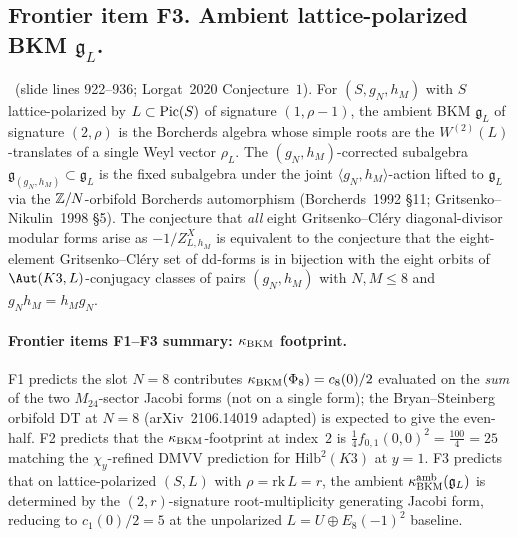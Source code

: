 \subsection*{Frontier item F3. Ambient lattice-polarized BKM $\mathfrak{g}_L$.}
\ClaimStatusConjectured\ (slide lines 922--936; Lorgat~2020
Conjecture~$1$). For $(S, g_N, h_M)$ with $S$ lattice-polarized by
$L\subset\mathrm{Pic}(S)$ of signature $(1,\rho-1)$, the ambient BKM
$\mathfrak{g}_L$ of signature $(2, \rho)$ is the Borcherds algebra
whose simple roots are the $W^{(2)}(L)$-translates of a single Weyl
vector $\rho_L$. The $(g_N, h_M)$-corrected subalgebra
$\mathfrak{g}_{(g_N, h_M)}\subset\mathfrak{g}_L$ is the fixed
subalgebra under the joint $\langle g_N, h_M\rangle$-action lifted to
$\mathfrak{g}_L$ via the $\mathbb{Z}/N$-orbifold Borcherds automorphism
(Borcherds~1992 \S 11; Gritsenko--Nikulin~1998 \S 5). The conjecture
that \emph{all} eight Gritsenko--Cl\'ery diagonal-divisor modular
forms arise as $-1/Z^X_{L, h_M}$ is equivalent to the conjecture that
the eight-element Gritsenko--Cl\'ery set of dd-forms is in bijection
with the eight orbits of $\Aut(K3, L)$-conjugacy classes of pairs
$(g_N, h_M)$ with $N, M\leq 8$ and $g_N h_M = h_M g_N$.

\paragraph{Frontier items F1--F3 summary: $\kappa_{\mathrm{BKM}}$ footprint.}
F1 predicts the slot $N=8$ contributes $\kappa_{\mathrm{BKM}}(\Phi_8) = c_8(0)/2$
evaluated on the \emph{sum} of the two $M_{24}$-sector Jacobi forms
(not on a single form); the Bryan--Steinberg orbifold DT at $N=8$
(arXiv~2106.14019 adapted) is expected to give the even-half.
F2 predicts that the $\kappa_{\mathrm{BKM}}$-footprint at index~$2$ is
$\tfrac14 f_{0,1}(0,0)^2 = \tfrac{100}{4} = 25$ matching the
$\chi_y$-refined DMVV prediction for $\mathrm{Hilb}^2(K3)$ at
$y = 1$. F3 predicts that on lattice-polarized
$(S, L)$ with $\rho = \mathrm{rk}\,L = r$, the ambient
$\kappa_{\mathrm{BKM}}^{\mathrm{amb}}(\mathfrak{g}_L)$ is determined
by the $(2, r)$-signature root-multiplicity generating Jacobi form,
reducing to $c_1(0)/2 = 5$ at the unpolarized $L = U\oplus E_8(-1)^2$
baseline.

